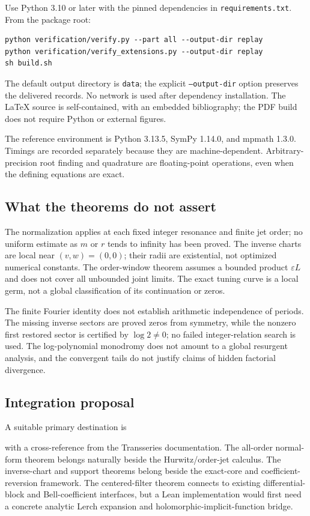 \documentclass[11pt,a4paper]{article}
\numberwithin{equation}{section}
\theoremstyle{definition}\newtheorem{definition}[theorem]{Definition}
\theoremstyle{remark}\newtheorem{remark}[theorem]{Remark}
\newcommand{\eps}{\varepsilon}
\begin{document}
Use Python 3.10 or later with the pinned dependencies in \texttt{requirements.txt}. From the package root:
\begin{verbatim}
python verification/verify.py --part all --output-dir replay
python verification/verify_extensions.py --output-dir replay
sh build.sh
\end{verbatim}
The default output directory is \texttt{data}; the explicit \texttt{--output-dir} option preserves the delivered records. No network is used after dependency installation. The LaTeX source is self-contained, with an embedded bibliography; the PDF build does not require Python or external figures.

The reference environment is Python 3.13.5, SymPy 1.14.0, and mpmath 1.3.0. Timings are recorded separately because they are machine-dependent. Arbitrary-precision root finding and quadrature are floating-point operations, even when the defining equations are exact.

\subsection{What the theorems do not assert}

The normalization applies at each fixed integer resonance and finite jet order; no uniform estimate as $m$ or $r$ tends to infinity has been proved. The inverse charts are local near $(v,w)=(0,0)$; their radii are existential, not optimized numerical constants. The order-window theorem assumes a bounded product $\eps L$ and does not cover all unbounded joint limits. The exact tuning curve is a local germ, not a global classification of its continuation or zeros.

The finite Fourier identity does not establish arithmetic independence of periods. The missing inverse sectors are proved zeros from symmetry, while the nonzero first restored sector is certified by $\log2\ne0$; no failed integer-relation search is used. The log-polynomial monodromy does not amount to a global resurgent analysis, and the convergent tails do not justify claims of hidden factorial divergence.

\subsection{Integration proposal}

A suitable primary destination is
\begin{center}\small
{}
\end{center}
with a cross-reference from the Transseries documentation. The all-order normal-form theorem belongs naturally beside the Hurwitz/order-jet calculus. The inverse-chart and support theorems belong beside the exact-core and coefficient-reversion framework. The centered-filter theorem connects to existing differential-block and Bell-coefficient interfaces, but a Lean implementation would first need a concrete analytic Lerch expansion and holomorphic-implicit-function bridge.
\end{document}
